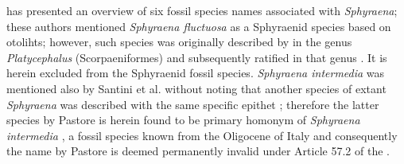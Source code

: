 \documentclass{article}
\begin{document}
\citet{Santini2015} has presented an overview of six fossil species names associated with \textit{Sphyraena}; these authors mentioned \textit{Sphyraena fluctuosa} as a Sphyraenid species based on otolihts; however, such species was originally described by \citet{Nolf1972} in the genus \textit{Platycephalus} (Scorpaeniformes) and subsequently ratified in that genus \citep[e.g.,][]{Huyghebaert1979}. It is herein excluded from the Sphyraenid fossil species. \textit{Sphyraena intermedia} \citealp{Bassani1889} was mentioned also by Santini et al. without noting that another species of extant \textit{Sphyraena} was described with the same specific epithet \citep{Pastore2009}; therefore the latter species by Pastore is herein found to be primary homonym of \textit{Sphyraena intermedia} \citep{Bassani1889}, a fossil species known from the Oligocene of Italy and consequently the name by Pastore is deemed permanently invalid under Article 57.2 of the \citet{ICZN1999}.




\end{document}
